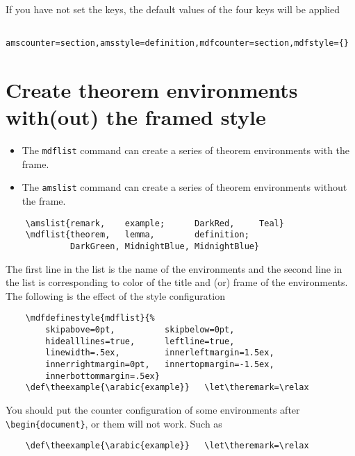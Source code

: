 \documentclass[11pt,svgnames]{article}
\begin{document}
If you have not set the keys, the default values of the four keys will be applied
\begin{verbatim}
    amscounter=section,amsstyle=definition,mdfcounter=section,mdfstyle={}
\end{verbatim}

\section{Create theorem environments with(out) the framed style}

\begin{itemize}
    \item The \verb+mdflist+ command can create a series of theorem environments with the frame.
    \item The \verb+amslist+ command can create a series of theorem environments without the frame.
\end{itemize}
\begin{verbatim}
    \amslist{remark,    example;      DarkRed,     Teal}
    \mdflist{theorem,   lemma,        definition;
             DarkGreen, MidnightBlue, MidnightBlue}
\end{verbatim}

The first line in the list is the name of the environments and the second line in the list is corresponding to color of the title and (or) frame of the environments. The following is the effect of the style configuration
\begin{verbatim}
    \mdfdefinestyle{mdflist}{%
        skipabove=0pt,          skipbelow=0pt,
        hidealllines=true,      leftline=true,
        linewidth=.5ex,         innerleftmargin=1.5ex,
        innerrightmargin=0pt,   innertopmargin=-1.5ex,
        innerbottommargin=.5ex}
    \def\theexample{\arabic{example}}   \let\theremark=\relax
\end{verbatim}

You should put the counter configuration of some environments after \verb|\begin{document}|, or them will not work. Such as
\begin{verbatim}
    \def\theexample{\arabic{example}}   \let\theremark=\relax
\end{verbatim}

\def\theexample{\arabic{example}}\let\theremark=\relax
\begin{definition}
    
\end{definition}
\begin{lemma}
    
\end{lemma}
\begin{theorem}
    
\end{theorem}
\end{document}

